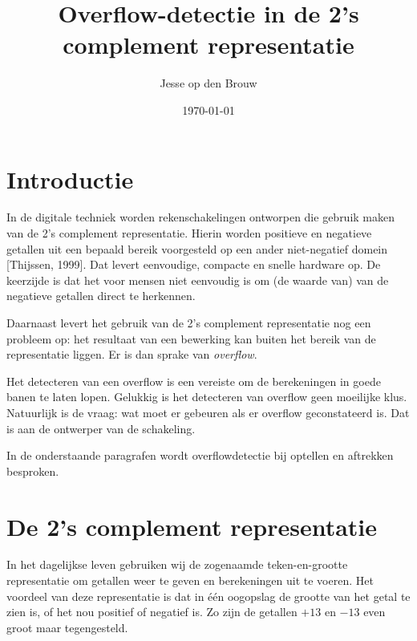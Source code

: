 \documentclass[a4paper,12pt,oneside]{article}
\author{Jesse op den Brouw}
\title{Overflow-detectie in de 2's complement representatie}
\date{\today}
\theoremstyle{own}
\begin{document}
\maketitle

\vfill

%
%

\newpage
\section{Introductie}
In de digitale techniek worden rekenschakelingen ontworpen die gebruik maken
van de 2's complement representatie. Hierin worden positieve en negatieve
getallen uit een bepaald bereik voorgesteld op een ander niet-negatief
domein [Thijssen, 1999].
Dat levert eenvoudige, compacte en snelle hardware op.
De keerzijde is dat het voor mensen niet eenvoudig is om (de waarde van) van
de negatieve getallen direct te herkennen.

Daarnaast levert het gebruik van de 2's complement representatie nog een
probleem op: het resultaat van een bewerking kan buiten het bereik van de
representatie liggen. Er is dan sprake van \textsl{overflow}.

Het detecteren van een overflow is een vereiste om de berekeningen in goede
banen te laten lopen. Gelukkig is het detecteren van overflow geen moeilijke
klus. Natuurlijk is de vraag: wat moet er gebeuren als er
overflow geconstateerd is. Dat is aan de ontwerper van de schakeling.

In de onderstaande paragrafen wordt overflowdetectie bij optellen en
aftrekken besproken.

\section{De 2's complement representatie}
In het dagelijkse leven gebruiken wij de zogenaamde teken-en-grootte
representatie om getallen weer te geven en berekeningen uit te voeren.
Het voordeel van deze representatie is dat in \'e\'en oogopslag de grootte
van het getal te zien is, of het nou positief of negatief is. Zo zijn de
getallen $+13$ en $-13$ even groot maar tegengesteld.
\end{document}
